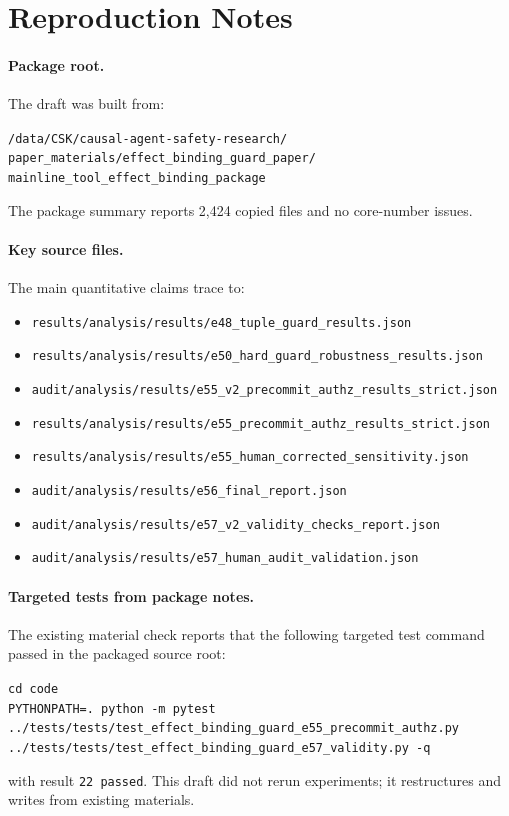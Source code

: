 \section{Reproduction Notes}

\paragraph{Package root.}
The draft was built from:
\begin{flushleft}
\small\texttt{/data/CSK/causal-agent-safety-research/}\\
\small\texttt{paper\_materials/effect\_binding\_guard\_paper/}\\
\small\texttt{mainline\_tool\_effect\_binding\_package}
\end{flushleft}
The package summary reports 2,424 copied files and no core-number issues.

\paragraph{Key source files.}
The main quantitative claims trace to:
\begin{itemize}[leftmargin=*]
\item \texttt{results/analysis/results/e48\_tuple\_guard\_results.json}
\item \texttt{results/analysis/results/e50\_hard\_guard\_robustness\_results.json}
\item \texttt{audit/analysis/results/e55\_v2\_precommit\_authz\_results\_strict.json}
\item \texttt{results/analysis/results/e55\_precommit\_authz\_results\_strict.json}
\item \texttt{results/analysis/results/e55\_human\_corrected\_sensitivity.json}
\item \texttt{audit/analysis/results/e56\_final\_report.json}
\item \texttt{audit/analysis/results/e57\_v2\_validity\_checks\_report.json}
\item \texttt{audit/analysis/results/e57\_human\_audit\_validation.json}
\end{itemize}

\paragraph{Targeted tests from package notes.}
The existing material check reports that the following targeted test command passed in the packaged source root:
\begin{flushleft}
\small\texttt{cd code}\\
\small\texttt{PYTHONPATH=. python -m pytest}\\
\small\texttt{../tests/tests/test\_effect\_binding\_guard\_e55\_precommit\_authz.py}\\
\small\texttt{../tests/tests/test\_effect\_binding\_guard\_e57\_validity.py -q}
\end{flushleft}
with result \texttt{22 passed}. This draft did not rerun experiments; it restructures and writes from existing materials.
